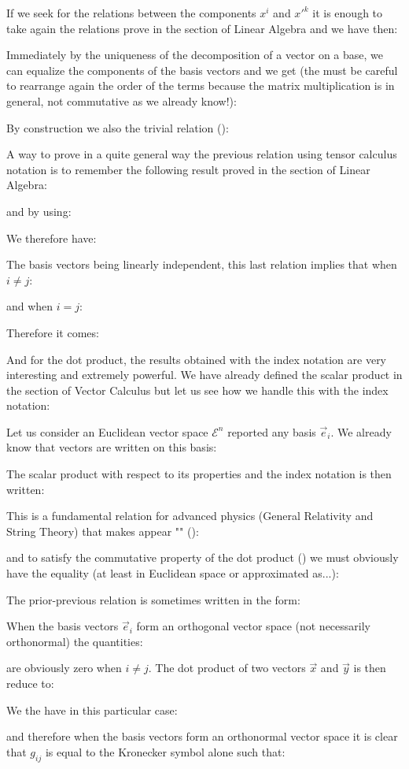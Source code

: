 	If we seek for the relations between the components $x^i$ and ${x'}^k$ it is enough to take again the relations prove in the section of Linear Algebra and we have then:
	
	Immediately by the uniqueness of the decomposition of a vector on a base, we can equalize the components of the basis vectors and we get (the must be careful to rearrange again the order of the terms because the matrix multiplication is in general, not commutative as we already know!):
	
	By construction we also the trivial relation ():
	
	A way to prove in a quite general way the previous relation using tensor calculus notation is to remember the following result proved in the section of Linear Algebra:
	
	and by using:
	
	We therefore have:
	
	The basis vectors being linearly independent, this last relation implies that when $i\neq j$:
	
	and when $i=j$:
	
	Therefore it comes:
	
	And for the dot product, the results obtained with the index notation are very interesting and extremely powerful. We have already defined the scalar product in the section of Vector Calculus but let us see how we handle this with the index notation:

	Let us consider an Euclidean vector space $\mathcal{E}^n$ reported any basis ${\vec{e}_i}$. We already know that vectors are written on this basis:
	
	The scalar product with respect to its properties and the index notation is then written:
	
	This is a fundamental relation for advanced physics (General Relativity and String Theory) that makes appear "" ():
	
	and to satisfy the commutative property of the dot product () we must obviously have the equality (at least in Euclidean space or approximated as...):
	
	The prior-previous relation is sometimes written in the form:
	
	\begin{tcolorbox}[title=Remark,colframe=black,arc=10pt]
	When the basis vectors $\vec{e}_i$ form an orthogonal vector space (not necessarily orthonormal) the quantities:
	
	are obviously zero when $i \neq j$. The dot product of two vectors $\vec{x}$ and $\vec{y}$ is then reduce to:
	
	We the have in this particular case:
	
	and therefore when the basis vectors form an orthonormal vector space it is clear that $g_{ij}$ is equal to the Kronecker symbol alone such that:
	
	\end{tcolorbox}
	

